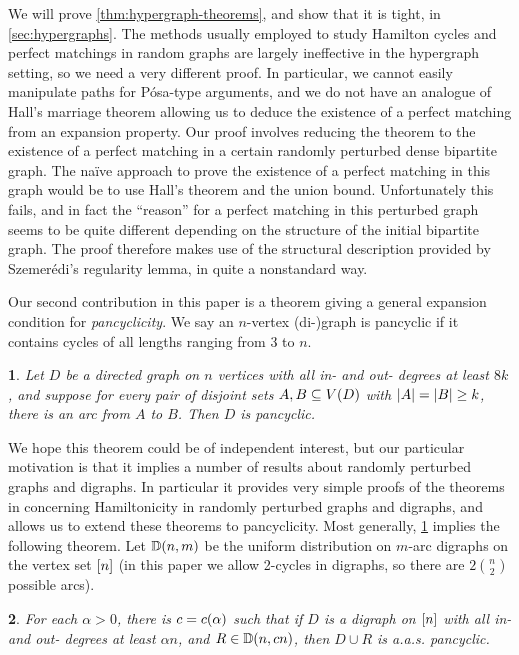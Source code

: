 \documentclass[11pt,english]{article}
\theoremstyle{plain}
\newtheorem{thm}{\protect\theoremname}
\theoremstyle{definition}
\theoremstyle{definition}
\theoremstyle{plain}
\theoremstyle{plain}
\theoremstyle{plain}
\theoremstyle{plain}
\theoremstyle{remark}
\theoremstyle{remark}
\let\originalleft\left
\let\originalright\right
\renewcommand{\left}{\mathopen{}\mathclose\bgroup\originalleft}
\renewcommand{\right}{\aftergroup\egroup\originalright}
\providecommand{\theoremname}{Theorem}
\begin{document}
We will prove \ref{thm:hypergraph-theorems}, and show that it is
tight, in \ref{sec:hypergraphs}. The methods usually employed to
study Hamilton cycles and perfect matchings in random graphs are largely
ineffective in the hypergraph setting, so we need a very different
proof. In particular, we cannot easily manipulate paths for P\'osa-type
arguments, and we do not have an analogue of Hall's marriage theorem
allowing us to deduce the existence of a perfect matching from an
expansion property. Our proof involves reducing the theorem to the
existence of a perfect matching in a certain randomly perturbed dense bipartite
graph. The na\"ive approach to prove the existence of a perfect matching in this graph would be to use Hall's theorem and the union bound. Unfortunately this fails, and in fact the ``reason'' for a perfect matching in this perturbed graph seems to be quite different depending on the structure of the initial bipartite graph. The proof therefore makes use of the structural description provided by Szemer\'edi's regularity lemma, in quite a nonstandard way.

Our second contribution in this paper is a theorem giving a general
expansion condition for\emph{ pancyclicity}. We say an $n$-vertex
\mbox{(di-)}graph is pancyclic if it contains cycles of all lengths
ranging from 3 to $n$.
\begin{thm}
\label{lem:pseudorandom-pancyclic}Let $D$ be a directed graph on
$n$ vertices with all in- and out- degrees at least $8k$, and suppose
for every pair of disjoint sets $A,B\subseteq V\left(D\right)$ with $\left|A\right|=\left|B\right|\ge k$,
there is an arc from $A$ to $B$. Then $D$ is pancyclic.
\end{thm}
We hope this theorem could be of independent interest, but our particular
motivation is that it implies a number of results about randomly perturbed
graphs and digraphs. In particular it provides very simple proofs
of the theorems in \cite{BFM03} concerning Hamiltonicity in randomly
perturbed graphs and digraphs, and allows us to extend these theorems
to pancyclicity. Most generally, \ref{lem:pseudorandom-pancyclic} implies the following theorem. Let $\DD\left(n,m\right)$ be the uniform
distribution on $m$-arc digraphs on the vertex set $\range n$ (in this paper we allow 2-cycles in digraphs, so there are $2{n\choose2}$ possible arcs).

\begin{thm}
\label{thm:smoothed-pancyclic}For each $\alpha>0$, there is $\cdi=\cdi\left(\alpha\right)$ such that
if $D$ is a digraph on $\range n$ with all in- and out- degrees at least $\alpha n$,
and $R\in\DD\left(n,\cdi n\right)$, then $D\cup R$
is a.a.s. pancyclic.
\end{thm}
\end{document}

